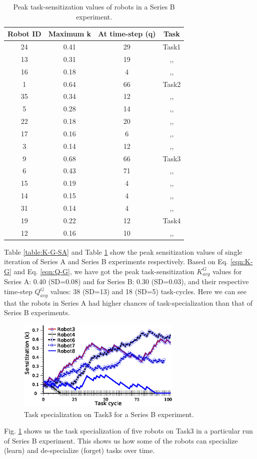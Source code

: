 \documentclass[smallcondensed]{svjour3}
\begin{document}
\begin{table}
\centering
\caption{Peak task-sensitization values of robots in a Series B experiment.}
\begin{tabular}{|c|c|c|c|}
\hline \textbf{Robot ID} & \textbf{Maximum k} & \textbf{At time-step (q)} & \textbf{Task} \\
\hline 24 & 0.41 & 29 & Task1\\
\hline 13 & 0.31 & 19 & ,,\\
\hline 16 & 0.18 & 4 & ,,\\
\hline 1 & 0.64 & 66 & Task2\\
\hline 35 & 0.34 & 12 & ,,\\
\hline 5 & 0.28 & 14 & ,,\\
\hline 22 & 0.18 & 20 & ,,\\
\hline 17 & 0.16 & 6 & ,,\\
\hline 3 & 0.14 & 12 & ,,\\
\hline 9 & 0.68 & 66 & Task3\\
\hline 6 & 0.43 & 71 & ,,\\
\hline 15 & 0.19 & 4 & ,,\\
\hline 14 & 0.15 & 4 & ,,\\
\hline 31 & 0.14 & 4 & ,,\\
\hline 19 & 0.22 & 12 & Task4\\
\hline 12 & 0.16 & 10 & ,,\\
\hline 
\end{tabular} 
\label{table:K-G-SB}
\end{table}
Table \ref{table:K-G-SA} and Table \ref{table:K-G-SB} show the peak sensitization values of single iteration of Series A and Series B experiments respectively.  Based on Eq. \ref{eqn:K-G} and Eq. \ref{eqn:Q-G}, we have got the peak task-sensitization $K^G_{avg} 
$ values for Series A: 0.40 (SD=0.08)  and for Series B: 0.30 (SD=0.03), and their respective time-step $Q^G_{avg}$ values: 38 (SD=13) and 18 (SD=5) task-cycles. Here we can see that the robots in Series A had higher chances of task-specialization than that of Series B experiments.
\begin{figure}
\centering
\includegraphics[width=0.7\textwidth, angle=0]{./TaskSpecialization-task3-10may-1.eps}
\caption{Task specialization on Task3 for a Series B experiment.}
\label{fig:k-single-task-SB} 
\end{figure}
Fig. \ref{fig:k-single-task-SB} shows us the task specialization of five robots on Task3 in a particular run of Series B experiment. This shows us how some of the robots can specialize (learn) and de-specialize (forget) tasks over time.
\end{document}
